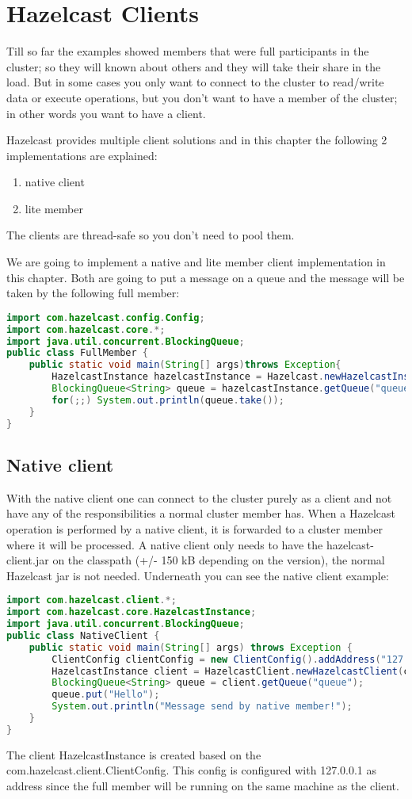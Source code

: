 \chapter{Hazelcast Clients}
Till so far the examples showed members that were full participants in the cluster; so they will known about others and they will take their share in the load. But in some cases you only want to connect to the cluster to read/write data or execute operations, but you don't want to have a member of the cluster; in other words you want to have a client.

Hazelcast provides multiple client solutions and in this chapter the following 2 implementations are explained:
\begin{enumerate}
\item native client
\item lite member
\end{enumerate}
The clients are thread-safe so you don't need to pool them.

We are going to implement a native and lite member client implementation in this chapter. Both are going to put a message on a queue and the message will be taken by the following full member:
\begin{lstlisting}[language=java]
import com.hazelcast.config.Config;
import com.hazelcast.core.*;
import java.util.concurrent.BlockingQueue;
public class FullMember {
    public static void main(String[] args)throws Exception{
        HazelcastInstance hazelcastInstance = Hazelcast.newHazelcastInstance();
        BlockingQueue<String> queue = hazelcastInstance.getQueue("queue");
        for(;;) System.out.println(queue.take());
    }
}
\end{lstlisting}

\section{Native client}
With the native client one can connect to the cluster purely as a client and not have any of the responsibilities a normal cluster member has. When a Hazelcast operation is performed by a native client, it is forwarded to a cluster member where it will be processed. A native client only needs to have the hazelcast-client.jar on the classpath (+/- 150 kB depending on the version), the normal Hazelcast jar is not needed. Underneath you can see the native client example:
\begin{lstlisting}[language=java]
import com.hazelcast.client.*;
import com.hazelcast.core.HazelcastInstance;
import java.util.concurrent.BlockingQueue;
public class NativeClient {
    public static void main(String[] args) throws Exception {
        ClientConfig clientConfig = new ClientConfig().addAddress("127.0.0.1");
        HazelcastInstance client = HazelcastClient.newHazelcastClient(clientConfig);
        BlockingQueue<String> queue = client.getQueue("queue");
        queue.put("Hello");
        System.out.println("Message send by native member!");
    }
}
\end{lstlisting}
The client HazelcastInstance is created based on the com.hazelcast.client.ClientConfig. This config is configured with 127.0.0.1 as address since the full member will be running on the same machine as the client.

